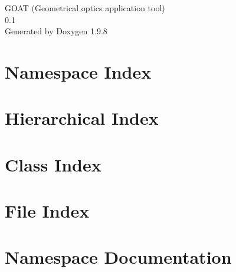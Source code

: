 \documentclass[twoside]{book}
\newcommand{\+}{\discretionary{\mbox{\scriptsize$\hookleftarrow$}}{}{}}
\newcommand{\clearemptydoublepage}{%
    \newpage{\pagestyle{empty}\cleardoublepage}%
  }
\begin{document}
  \raggedbottom
    \hypersetup{pageanchor=false,
                bookmarksnumbered=true,
                pdfencoding=unicode
               }
  \begin{titlepage}
  \vspace*{7cm}
  \begin{center}%
  {\Large GOAT (\+Geometrical optics application tool)}\\
  [1ex]\large 0.\+1 \\
  \vspace*{1cm}
  {\large Generated by Doxygen 1.9.8}\\
  \end{center}
  \end{titlepage}
  \clearemptydoublepage
  \tableofcontents
  \clearemptydoublepage
  \hypersetup{pageanchor=true}



\chapter{Namespace Index}

\chapter{Hierarchical Index}

\chapter{Class Index}

\chapter{File Index}

\chapter{Namespace Documentation}





\end{document}
